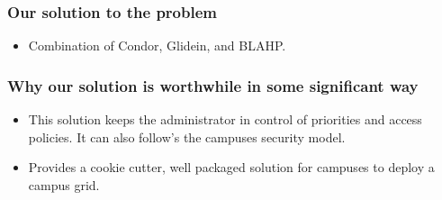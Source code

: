\documentclass[11pt]{article}
\begin{document}
\subsubsection*{Our solution to the problem}
\begin{itemize}



\item
Combination of Condor, Glidein, and BLAHP.

\end{itemize}



\subsubsection*{Why our solution is worthwhile in some significant way}
\begin{itemize}


\item
This solution keeps the administrator in control of priorities and access policies.  It can also follow's the campuses security model.

\end{itemize}



\begin{itemize}


\item
Provides a cookie cutter, well packaged solution for campuses to deploy a campus grid.

\end{itemize}
\end{document}
